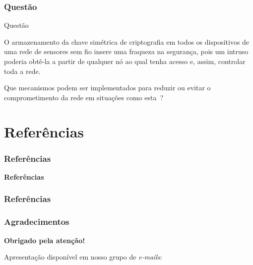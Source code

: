 \documentclass[notes]{beamer}
\begin{document}
\begin{frame}
\label{slide_079}
\frametitle{Questão}

\begin{block}{Questão}

O armazenamento da chave simétrica de criptografia em todos os dispositivos de uma rede de sensores sem fio insere uma fraqueza na segurança, pois um intruso poderia obtê-la a partir de qualquer nó ao qual tenha acesso e, assim, controlar toda a rede.

\end{block} \pause

\begin{block}

Que mecanismos podem ser implementados para reduzir ou evitar o comprometimento da rede em situações como esta~\cite{Clicia}?

\end{block}

\end{frame}

\section{Referências}
\begin{frame}
\label{slide_080}
\frametitle{Referências}

\begin{block}

 \center \textbf{Referências}

\end{block}

\end{frame}

\begin{frame}[allowframebreaks]
\label{slide_81}
\frametitle{Referências}




\end{frame}

\begin{frame}
\label{slide_82}
\frametitle{Agradecimentos}
\vskip20pt

\begin{center}
{\bf \color{alert} Obrigado pela atenção!}
\end{center}

\vskip20pt

\begin{center}
Apresentação disponível em nosso grupo de \textit{e-mails}:\\
\vskip12pt
\end{center}

\titlepage
\end{frame}
\end{document}
